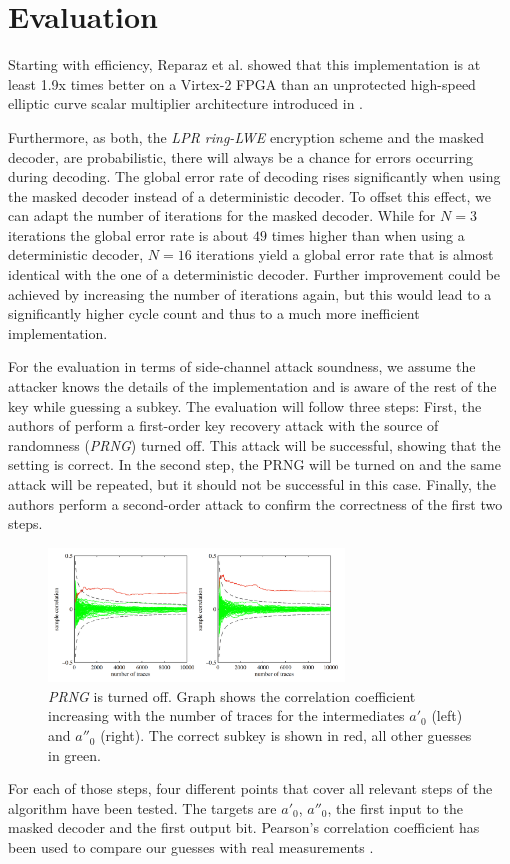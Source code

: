 \section{Evaluation}
Starting with efficiency, Reparaz et al. showed that this implementation is at least 1.9x times better on a Virtex-2 FPGA than an unprotected high-speed elliptic curve scalar multiplier architecture introduced in \cite{Rebeiro2012}.

Furthermore, as both, the \textit{\ac{LPR} \ac{ring-LWE}} encryption scheme and the masked decoder, are probabilistic, there will always be a chance for errors occurring during decoding. The global error rate of decoding rises significantly when using the masked decoder instead of a deterministic decoder. To offset this effect, we can adapt the number of iterations for the masked decoder. While for \(N=3\) iterations the global error rate is about \(49\) times higher than when using a deterministic decoder, \(N=16\) iterations yield a global error rate that is almost identical with the one of a deterministic decoder. Further improvement could be achieved by increasing the number of iterations again, but this would lead to a significantly higher cycle count and thus to a much more inefficient implementation.

For the evaluation in terms of side-channel attack soundness, we assume the attacker knows the details of the implementation and is aware of the rest of the key while guessing a subkey. The evaluation will follow three steps: First, the authors of \cite{maskedRing} perform a first-order key recovery attack with the source of randomness (\textit{\acs{PRNG}}) turned off. This attack will be successful, showing that the setting is correct. In the second step, the PRNG will be turned on and the same attack will be repeated, but it should not be successful in this case. Finally, the authors perform a second-order attack to confirm the correctness of the first two steps.
\begin{figure}[H]
	\centering
	\includegraphics[width=0.7\textwidth]{dpa_1.png}
	\caption{\textit{\acs{PRNG}} is turned off. Graph shows the correlation coefficient increasing with the number of traces for the intermediates \(a'_0\) (left) and \(a''_0\) (right). The correct subkey is shown in red, all other guesses in green. \cite{maskedRing}}
	\label{dpa_1}
\end{figure}
For each of those steps, four different points that cover all relevant steps of the algorithm have been tested. The targets are \(a'_0\), \(a''_0\), the first input to the masked decoder and the first output bit. Pearson's correlation coefficient has been used to compare our guesses with real measurements \cite{Brier2004}.

